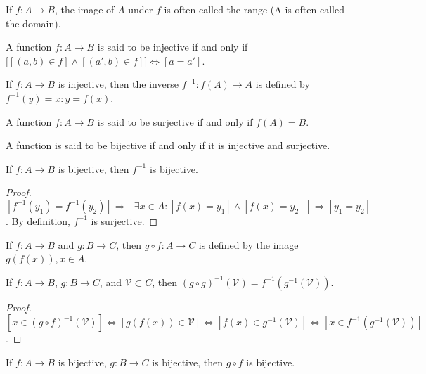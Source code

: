 \documentclass[crop=false,class=book,oneside]{standalone}
\begin{document}
        \begin{remark}
        If $f:A\rightarrow B$, the image of $A$ under $f$ is often called the range (A is often called the domain).
        \end{remark}
        \begin{definition}
        A function $f:A\rightarrow B$ is said to be injective if and only if $\big[[(a,b)\in f]\land[(a',b)\in f]\big]\Leftrightarrow [a=a']$.
        \end{definition}
        \begin{definition}
        If $f:A\rightarrow B$ is injective, then the inverse $f^{-1}:f(A)\rightarrow A$ is defined by $f^{-1}(y)=x:y=f(x)$.
        \end{definition}
        \begin{definition}
        A function $f:A\rightarrow B$ is said to be surjective if and only if $f(A) = B$.
        \end{definition}
        \begin{definition}
        A function is said to be bijective if and only if it is injective and surjective.
        \end{definition}
        \begin{theorem}
        If $f:A\rightarrow B$ is bijective, then $f^{-1}$ is bijective.
        \end{theorem}
        \begin{proof}
        $[f^{-1}(y_1) = f^{-1}(y_2)]\Rightarrow [\exists x\in A:[f(x) = y_1]\land [f(x)=y_2]]\Rightarrow [y_1=y_2]$. By definition, $f^{-1}$ is surjective.
        \end{proof}
        \begin{definition}
        If $f:A\rightarrow B$ and $g:B\rightarrow C$, then $g\circ f:A\rightarrow C$ is defined by the image $g(f(x)), x\in A$. 
        \end{definition}
        \begin{theorem}
        If $f:A\rightarrow B$, $g:B\rightarrow C$, and $\mathcal{V}\subset C$, then $(g\circ g)^{-1}(\mathcal{V}) = f^{-1}(g^{-1}(\mathcal{V}))$.
        \end{theorem}
        \begin{proof}
        $[x\in (g\circ f)^{-1}(\mathcal{V})]\Leftrightarrow [g(f(x))\in \mathcal{V}] \Leftrightarrow [f(x)\in g^{-1}(\mathcal{V})]\Leftrightarrow [x\in f^{-1}(g^{-1}(\mathcal{V}))]$.
        \end{proof}
        \begin{theorem}
        If $f:A\rightarrow B$ is bijective, $g:B\rightarrow C$ is bijective, then $g\circ f$ is bijective.
        \end{theorem}
\end{document}
